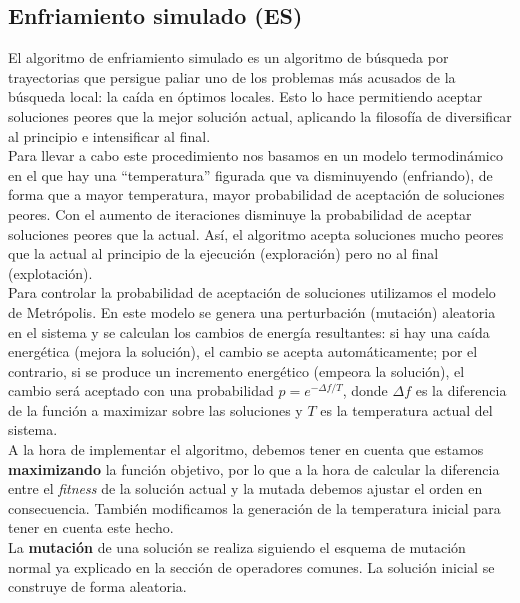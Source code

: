 \documentclass[12pt]{article}
\begin{document}
\subsection*{Enfriamiento simulado (ES)}
\label{es}

El algoritmo de enfriamiento simulado es un algoritmo de búsqueda por trayectorias que persigue paliar uno de los problemas más acusados de la búsqueda local: la caída en óptimos locales. Esto lo hace permitiendo aceptar soluciones peores que la mejor solución actual, aplicando la filosofía de diversificar al principio e intensificar al final.\\

Para llevar a cabo este procedimiento nos basamos en un modelo termodinámico en el que hay una ``temperatura'' figurada que va disminuyendo (enfriando), de forma que a mayor temperatura, mayor probabilidad de aceptación de soluciones peores. Con el aumento de iteraciones disminuye la probabilidad de aceptar soluciones peores que la actual. Así, el algoritmo acepta soluciones mucho peores que la actual al principio de la ejecución (exploración) pero no al final (explotación).\\

Para controlar la probabilidad de aceptación de soluciones utilizamos el modelo de Metrópolis. En este modelo se genera una perturbación (mutación) aleatoria en el sistema y se calculan los cambios de energía resultantes: si hay una caída energética (mejora la solución), el cambio se acepta automáticamente; por el contrario,
si se produce un incremento energético (empeora la solución), el cambio será aceptado con una probabilidad $p = e^{- \Delta f / T}$, donde $\Delta f$ es la diferencia de la función a maximizar sobre las soluciones y $T$ es la temperatura actual del sistema.\\

A la hora de implementar el algoritmo, debemos tener en cuenta que estamos \textbf{maximizando} la función objetivo, por lo que a la hora de calcular la diferencia entre el \textit{fitness} de la solución actual y la mutada debemos ajustar el orden en consecuencia. También modificamos la generación de la temperatura inicial para tener en cuenta este hecho.\\

La \textbf{mutación} de una solución se realiza siguiendo el esquema de mutación normal ya explicado en la sección de operadores comunes. La solución inicial se construye de forma aleatoria.\\
\end{document}
